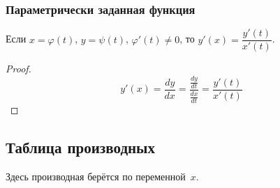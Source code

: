 \subsubsection{Параметрически заданная функция}
Если $x = \varphi(t)$, $y = \psi(t)$, $\varphi'(t) \neq 0$, то $y'(x) = \dfrac{y'(t)}{x'(t)}$.
\begin{proof}
\begin{equation*}
y'(x) = \frac{dy}{dx} = \frac{\frac{dy}{dt}}{\frac{dx}{dt}} = \frac{y'(t)}{x'(t)}
\end{equation*}
\end{proof}

\subsection{Таблица производных}
Здесь производная берётся по переменной~$x$.
